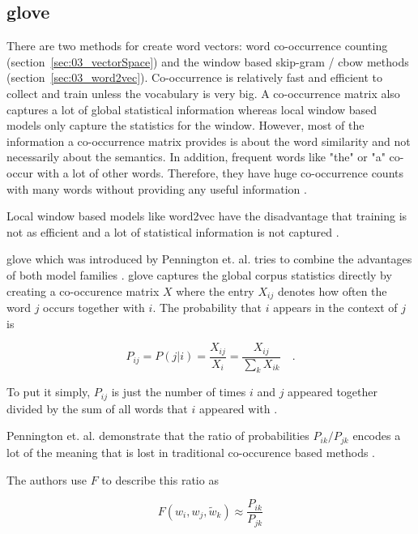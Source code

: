 \subsection{\acrfull{glove}}

There are two methods for create word vectors: word co-occurrence counting {(section~\ref{sec:03_vectorSpace})} and the window based skip-gram / \gls{cbow} methods {(section~\ref{sec:03_word2vec})}. Co-occurrence is relatively fast and efficient to collect and train unless the vocabulary is very big. A co-occurrence matrix also captures a lot of global statistical information whereas local window based models only capture the statistics for the window. However, most of the information a co-occurrence matrix provides is about the word similarity and not necessarily about the semantics. In addition, frequent words like "the" or "a" co-occur with a lot of other words. Therefore, they have huge co-occurrence counts with many words without providing any useful information \cite{Pennington2014a}.

Local window based models like word2vec have the disadvantage that training is not as efficient and a lot of statistical information is not captured \cite{Pennington2014a}. 
\medskip

\gls{glove} which was introduced by Pennington et. al. tries to combine the advantages of both model families \cite{Pennington2014a}. \gls{glove} captures the global corpus statistics directly by creating a co-occurence matrix $X$ where the entry $X_{ij}$ denotes how often the word $j$ occurs together with $i$. The probability that $i$ appears in the context of $j$ is 

\begin{equation}
	P_{ij}=P(j|i)=\frac{X_{ij}}{X_i}=\frac{X_{ij}}{\sum_k X_{ik}}\quad.
\end{equation}

To put it simply, $P_{ij}$ is just the number of times $i$ and $j$ appeared together divided by the sum of all words that $i$ appeared with \cite{Pennington2014a}.

Pennington et. al. demonstrate that the ratio of probabilities $P_{ik} / P_{jk}$  encodes a lot of the meaning that is lost in traditional co-occurence based methods \cite{Pennington2014a}.
\medskip

The authors use $F$ to describe this ratio as

\begin{equation}
	F(w_i, w_j, \widetilde{w}_k) \approx \frac{P_{ik}}{P_{jk}}
\end{equation}

